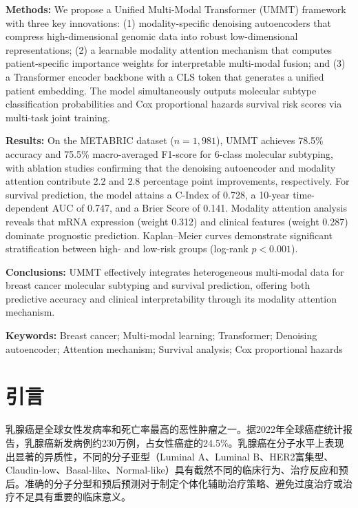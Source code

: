 \documentclass[conference]{IEEEtran}
\begin{document}
\textbf{Methods:} We propose a Unified Multi-Modal Transformer (UMMT) framework with three key innovations: (1) modality-specific denoising autoencoders that compress high-dimensional genomic data into robust low-dimensional representations; (2) a learnable modality attention mechanism that computes patient-specific importance weights for interpretable multi-modal fusion; and (3) a Transformer encoder backbone with a CLS token that generates a unified patient embedding. The model simultaneously outputs molecular subtype classification probabilities and Cox proportional hazards survival risk scores via multi-task joint training.

\textbf{Results:} On the METABRIC dataset ($n=1{,}981$), UMMT achieves 78.5\% accuracy and 75.5\% macro-averaged F1-score for 6-class molecular subtyping, with ablation studies confirming that the denoising autoencoder and modality attention contribute 2.2 and 2.8 percentage point improvements, respectively. For survival prediction, the model attains a C-Index of 0.728, a 10-year time-dependent AUC of 0.747, and a Brier Score of 0.141. Modality attention analysis reveals that mRNA expression (weight 0.312) and clinical features (weight 0.287) dominate prognostic prediction. Kaplan--Meier curves demonstrate significant stratification between high- and low-risk groups (log-rank $p < 0.001$).

\textbf{Conclusions:} UMMT effectively integrates heterogeneous multi-modal data for breast cancer molecular subtyping and survival prediction, offering both predictive accuracy and clinical interpretability through its modality attention mechanism.

\textbf{Keywords:} Breast cancer; Multi-modal learning; Transformer; Denoising autoencoder; Attention mechanism; Survival analysis; Cox proportional hazards

\section{引言}

乳腺癌是全球女性发病率和死亡率最高的恶性肿瘤之一。据2022年全球癌症统计报告，乳腺癌新发病例约230万例，占女性癌症的24.5\%\cite{bray2024global}。乳腺癌在分子水平上表现出显著的异质性，不同的分子亚型（Luminal A、Luminal B、HER2富集型、Claudin-low、Basal-like、Normal-like）具有截然不同的临床行为、治疗反应和预后\cite{perou2000molecular}。准确的分子分型和预后预测对于制定个体化辅助治疗策略、避免过度治疗或治疗不足具有重要的临床意义。
\end{document}
